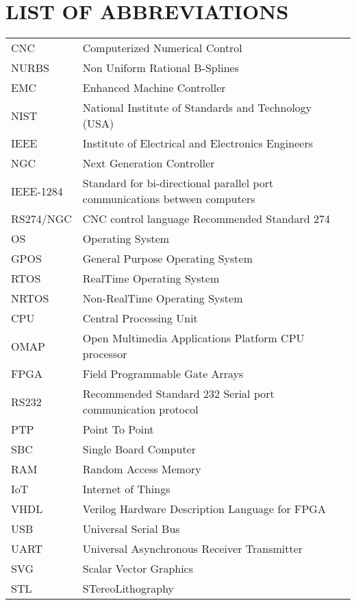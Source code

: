 \chapter{LIST OF ABBREVIATIONS}

\onehalfspacing
\noindent
\begin{tabular}{p{3.0cm}p{10.0cm}} 

CNC       & Computerized Numerical Control\\
NURBS     & Non Uniform Rational B-Splines\\
EMC       & Enhanced Machine Controller\\
NIST      & National Institute of Standards and Technology (USA)\\
IEEE      & Institute of Electrical and Electronics Engineers\\
NGC       & Next Generation Controller\\

IEEE-1284 & Standard for bi-directional parallel port communications between computers\\
RS274/NGC & CNC control language Recommended Standard 274\\
OS        & Operating System\\
GPOS      & General Purpose Operating System\\
RTOS      & RealTime Operating System\\
NRTOS     & Non-RealTime Operating System\\
CPU       & Central Processing Unit\\
OMAP      & Open Multimedia Applications Platform CPU processor\\
FPGA      & Field Programmable Gate Arrays\\

RS232     & Recommended Standard 232 Serial port communication protocol\\
PTP       & Point To Point\\
SBC       & Single Board Computer\\
RAM       & Random Access Memory\\
IoT       & Internet of Things\\
VHDL      & Verilog Hardware Description Language for FPGA\\
USB       & Universal Serial Bus\\
UART      & Universal Asynchronous Receiver Transmitter\\
SVG       & Scalar Vector Graphics\\
STL       & STereoLithography\\
\end{tabular}

